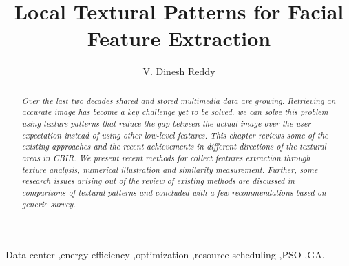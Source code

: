 \documentclass[review]{elsarticle}
\begin{document}
	\begin{frontmatter}
			\title{Local Textural Patterns for Facial Feature Extraction}
		\author[mysecondaryaddress]{V. Dinesh Reddy}
		\address[mysecondaryaddress]{Global Technology Office- Foundational Research,Cognizant Technology Solutions}
	
		
		\begin{abstract}
		\textit{ Over the last two decades shared and stored multimedia data are growing. Retrieving an accurate image has become a key challenge yet to be solved. we can solve this problem using texture patterns that reduce the gap between the actual image over the user expectation instead of using other low-level features. This chapter 
			reviews some of the existing approaches and the recent achievements in different directions  of the textural areas in CBIR. We present recent methods for   collect  features extraction through texture analysis, numerical illustration and similarity measurement. Further, some research issues arising out of the review of existing methods are discussed in comparisons of textural patterns and concluded with a few recommendations based on generic survey. }
	\end{abstract}
	\begin{keyword}
		Data center \sep  energy efficiency \sep optimization \sep  resource  scheduling \sep PSO \sep GA.
	\end{keyword}
\end{frontmatter}
\end{document}
